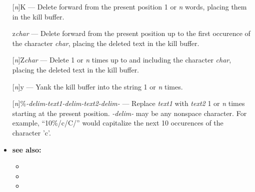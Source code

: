 \begin{itemize}
\item [] [{\em n}]K --- Delete forward from the present position 1 or {\em n} words, placing them in the kill buffer.
\item [] z{\em char} --- Delete forward from the present position up to the first occurence of the character {\em char},
        placing the deleted text in the kill buffer.
\item [] [{\em n}]Z{\em char} --- Delete 1 or {\em n} times up to and including the
        character {\em char}, placing the deleted text in the kill buffer.
\item [] [{\em n}]y --- Yank the kill buffer into the string 1 or {\em n} times.
\item [] [{\em n}]\%{\em -delim-}{\em text1}{\em -delim-}{\em text2}{\em -delim-} ---
        Replace {\em text1} with {\em text2} 1 or {\em n} times starting at the
        present position.  {\em -delim-} may be any nonspace character.  For example,
        ``10\%/c/C/'' would capitalize the next 10 occurences of the character 'c'.
\item {\bf see also:}
    \begin{itemize}
    \item {}
    \item {}
    \item {}
    \end{itemize}
\end{itemize}

